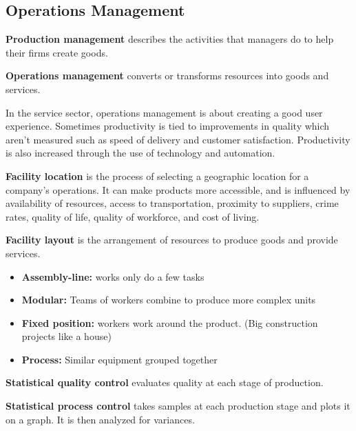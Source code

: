 \documentclass[english, 12pt]{article}
\begin{document}
\subsection{Operations Management}
\begin{defn}
\textbf{Production management} describes the activities that managers do to help their firms create goods.
\end{defn}
\begin{defn}
\textbf{Operations management} converts or transforms resources into goods and services.
\end{defn}
\begin{note}
In the service sector, operations management is about creating a good user experience. Sometimes productivity is tied to improvements in quality which aren't measured such as speed of delivery and customer satisfaction. Productivity is also increased through the use of technology and automation.
\end{note}
\begin{defn}
\textbf{Facility location} is the process of selecting a geographic location for a company's operations. It can make products more accessible, and is influenced by availability of resources, access to transportation, proximity to suppliers, crime rates, quality of life, quality of workforce, and cost of living.
\end{defn}
\begin{defn}
\textbf{Facility layout} is the arrangement of resources to produce goods and provide services.
\end{defn}
\begin{itemize}
\item \textbf{Assembly-line:} works only do a few tasks
\item \textbf{Modular:} Teams of workers combine to produce more complex units
\item \textbf{Fixed position:} workers work around the product. (Big construction projects like a house)
\item \textbf{Process:} Similar equipment grouped together
\end{itemize}
\begin{defn}[SQC]
\textbf{Statistical quality control} evaluates quality at each stage of production.
\end{defn}
\begin{defn}[SPC]
\textbf{Statistical process control} takes samples at each production stage and plots it on a graph. It is then analyzed for variances.
\end{defn}
\end{document}

